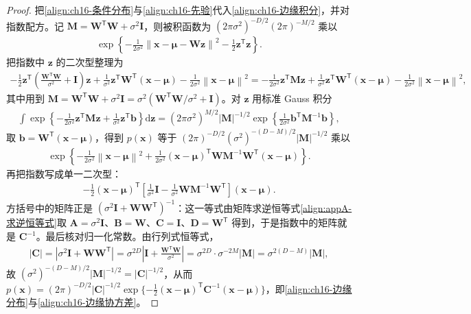 \documentclass[../../main.tex]{subfiles}
\begin{document}
\begin{proof}
把\eqref{align:ch16-条件分布}与\eqref{align:ch16-先验}代入\eqref{align:ch16-边缘积分}，并对指数配方。记 $\bm{M}=\bm{W}^{\mathsf T}\bm{W}+\sigma^2\bm{I}$，则被积函数为 $(2\pi\sigma^2)^{-D/2}(2\pi)^{-M/2}$ 乘以
\begin{align*}
  \exp\left\{-\frac{1}{2\sigma^2}\left\|\bm{x}-\bm{\mu}-\bm{W}\bm{z}\right\|^2-\frac{1}{2}\bm{z}^{\mathsf T}\bm{z}\right\}.
\end{align*}
把指数中 $\bm{z}$ 的二次型整理为
\begin{align*}
  -\frac{1}{2}\bm{z}^{\mathsf T}\left(\frac{\bm{W}^{\mathsf T}\bm{W}}{\sigma^2}+\bm{I}\right)\bm{z}+\frac{1}{\sigma^2}\bm{z}^{\mathsf T}\bm{W}^{\mathsf T}(\bm{x}-\bm{\mu})-\frac{1}{2\sigma^2}\left\|\bm{x}-\bm{\mu}\right\|^2
  =-\frac{1}{2\sigma^2}\bm{z}^{\mathsf T}\bm{M}\bm{z}+\frac{1}{\sigma^2}\bm{z}^{\mathsf T}\bm{W}^{\mathsf T}(\bm{x}-\bm{\mu})-\frac{1}{2\sigma^2}\left\|\bm{x}-\bm{\mu}\right\|^2,
\end{align*}
其中用到 $\bm{M}=\bm{W}^{\mathsf T}\bm{W}+\sigma^2\bm{I}=\sigma^2\left(\bm{W}^{\mathsf T}\bm{W}/\sigma^2+\bm{I}\right)$。对 $\bm{z}$ 用标准 Gauss 积分
\begin{align*}
  \int\exp\left\{-\frac{1}{2\sigma^2}\bm{z}^{\mathsf T}\bm{M}\bm{z}+\frac{1}{\sigma^2}\bm{z}^{\mathsf T}\bm{b}\right\}\mathrm{d}\bm{z}=(2\pi\sigma^2)^{M/2}|\bm{M}|^{-1/2}\exp\left\{\frac{1}{2\sigma^2}\bm{b}^{\mathsf T}\bm{M}^{-1}\bm{b}\right\},
\end{align*}
取 $\bm{b}=\bm{W}^{\mathsf T}(\bm{x}-\bm{\mu})$，得到 $p(\bm{x})$ 等于 $(2\pi)^{-D/2}(\sigma^2)^{-(D-M)/2}|\bm{M}|^{-1/2}$ 乘以
\begin{align*}
  \exp\left\{-\frac{1}{2\sigma^2}\left\|\bm{x}-\bm{\mu}\right\|^2+\frac{1}{2\sigma^2}(\bm{x}-\bm{\mu})^{\mathsf T}\bm{W}\bm{M}^{-1}\bm{W}^{\mathsf T}(\bm{x}-\bm{\mu})\right\}.
\end{align*}
再把指数写成单一二次型：
\begin{align*}
  -\frac{1}{2}(\bm{x}-\bm{\mu})^{\mathsf T}\left[\frac{1}{\sigma^2}\bm{I}-\frac{1}{\sigma^2}\bm{W}\bm{M}^{-1}\bm{W}^{\mathsf T}\right](\bm{x}-\bm{\mu}).
\end{align*}
方括号中的矩阵正是 $(\sigma^2\bm{I}+\bm{W}\bm{W}^{\mathsf T})^{-1}$：这一等式由矩阵求逆恒等式\eqref{align:appA-求逆恒等式}取 $\bm{A}=\sigma^2\bm{I}$、$\bm{B}=\bm{W}$、$\bm{C}=\bm{I}$、$\bm{D}=\bm{W}^{\mathsf T}$ 得到，于是指数中的矩阵就是 $\bm{C}^{-1}$。最后核对归一化常数。由行列式恒等式，
\begin{align*}
  |\bm{C}|=\left|\sigma^2\bm{I}+\bm{W}\bm{W}^{\mathsf T}\right|=\sigma^{2D}\left|\bm{I}+\frac{\bm{W}^{\mathsf T}\bm{W}}{\sigma^2}\right|=\sigma^{2D}\cdot\sigma^{-2M}|\bm{M}|=\sigma^{2(D-M)}|\bm{M}|,
\end{align*}
故 $(\sigma^2)^{-(D-M)/2}|\bm{M}|^{-1/2}=|\bm{C}|^{-1/2}$，从而 $p(\bm{x})=(2\pi)^{-D/2}|\bm{C}|^{-1/2}\exp\{-\frac{1}{2}(\bm{x}-\bm{\mu})^{\mathsf T}\bm{C}^{-1}(\bm{x}-\bm{\mu})\}$，即\eqref{align:ch16-边缘分布}与\eqref{align:ch16-边缘协方差}。
\end{proof}
\end{document}

